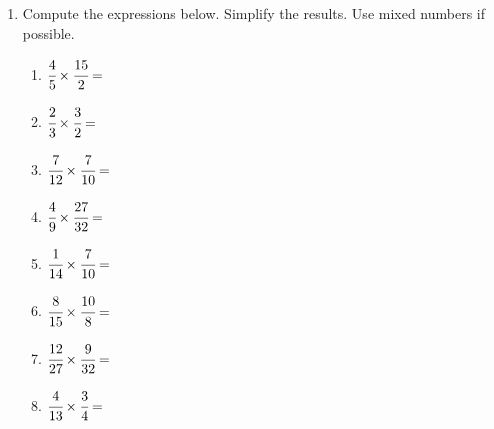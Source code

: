 \documentclass[12pt,letterpaper]{article}
\begin{document}
\begin{enumerate}
    \item Compute the expressions below. Simplify the results. Use mixed numbers if possible.
    \begin{multicols}{2}
    \begin{enumerate}
        \item $\cfrac{4}{5}\times\cfrac{15}{2}=$
        \item $\cfrac{2}{3}\times\cfrac{3}{2}=$
        \item $\cfrac{7}{12}\times\cfrac{7}{10}=$
        \item $\cfrac{4}{9}\times\cfrac{27}{32}=$
        \item $\cfrac{1}{14}\times\cfrac{7}{10}=$
        \item $\cfrac{8}{15}\times\cfrac{10}{8}=$
        \item $\cfrac{12}{27}\times\cfrac{9}{32}=$
        \item $\cfrac{4}{13}\times\cfrac{3}{4}=$
    \end{enumerate}
    \end{multicols}
\end{enumerate}
\end{document}
